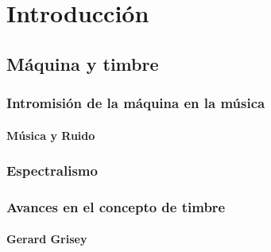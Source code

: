 \chapter{Introducción}
\section{Máquina y timbre}
\subsection{Intromisión de la máquina en la música} %
\subsubsection{Música y Ruido} %
\subsection{Espectralismo}
\subsection{Avances en el concepto de timbre}
\subsubsection{Gerard Grisey}